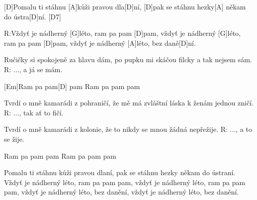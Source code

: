 
[D]Pomalu ti stáhnu [A]kůži pravou dla[D]ní, 
[D]pak se stáhnu hezky[A] někam do ústra[D]ní. [D7]

R:Vždyť je nádherný [G]léto, ram pa pam [D]pam, 
vždyť je nádherný [G]léto, ram pa pam [D]pam, 
vždyť je nádherný [A]léto, bez daně[D]ní. 

Ručičky si spokojeně za hlavu dám, 
po pupku mi skáčou filcky a tak nejsem sám. 
R: ..., a já se mám. 

[Em]Ram pa pam[D] pam 
Ram pa pam pam 

Tvrdí o mně kamarádi z pohraničí, 
že mě má zvláštní láska k ženám jednou zničí. 
R: ..., tak ať to fičí. 

Tvrdí o mně kamarádi z kolonie, 
že to nikdy se mnou žádná nepřežije. 
R: ..., a to se žije. 

Ram pa pam pam 
Ram pa pam pam 

Pomalu ti stáhnu kůži pravou dlaní, 
pak se stáhnu hezky někam do ústraní. 
Vždyť je nádherný léto, ram pa pam pam, 
vždyť je nádherný léto, ram pa pam pam, 
vždyť je nádherný léto, bez danění, 
vždyť je nádherný léto, bez danění. 
